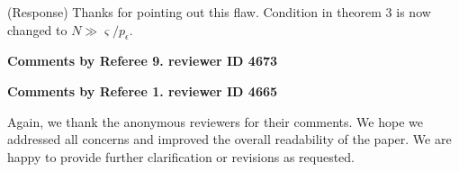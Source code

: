 \documentclass{letter}
\begin{document}
{\color{red}(Response)} Thanks for pointing out this flaw. Condition in theorem 3 is now changed to $ N\gg \varsigma/p_\epsilon $. 

{\bf Comments by Referee 9. reviewer ID 4673}

{\bf Comments by Referee 1. reviewer ID 4665}

Again, we thank the anonymous reviewers for their comments. We hope we 
addressed all concerns and improved the overall readability of the paper. We are happy to provide further clarification or revisions as requested.





\small
%


\end{document}
